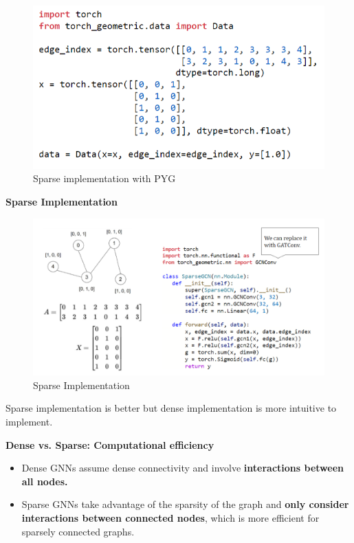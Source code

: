\begin{figure}[h!t]
    \centering
    \includegraphics[width=0.75\linewidth]{sparseimp.png}
    \caption{Sparse implementation with PYG}
    \label{fig:enter-label}
\end{figure}

\newpage

\noindent \textbf{Sparse Implementation}

\begin{figure}[h!t]
    \centering
    \includegraphics[width=1\linewidth]{sparseimplementation.png}
    \caption{Sparse Implementation}
    \label{fig:enter-label}
\end{figure}

Sparse implementation is better but dense implementation is more intuitive to implement.

\newpage

\noindent
\textbf{Dense vs. Sparse: Computational efficiency}\\
\begin{itemize}
    \item Dense GNNs assume dense connectivity and involve\textbf{ interactions between all nodes.}
    \item Sparse GNNs take advantage of the sparsity of the graph and \textbf{only consider interactions between connected nodes}, which is more efficient for sparsely connected graphs.
\end{itemize}

